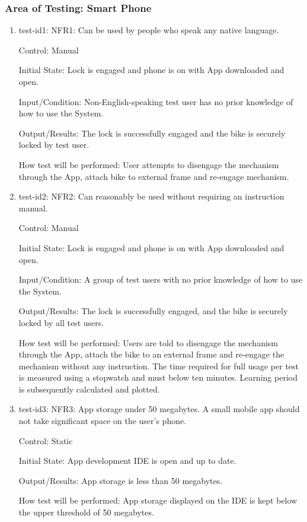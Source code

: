 \documentclass[12pt, titlepage]{article}
\begin{document}
\subsubsection{Area of Testing: Smart Phone}

\begin{enumerate}

\item{test-id1: NFR1: Can be used by people who speak any native language. \\}

Control: Manual

Initial State: Lock is engaged and phone is on with App downloaded and open.

Input/Condition: Non-English-speaking test user has no prior knowledge of how to use the System.

Output/Results: The lock is successfully engaged and the bike is securely locked by test user.

How test will be performed: User attempts to disengage the mechanism through the App, attach bike to external frame and re-engage mechanism.
					
\item{test-id2: NFR2: Can reasonably be used without requiring an instruction manual. \\}

Control: Manual

Initial State: Lock is engaged and phone is on with App downloaded and open.

Input/Condition: A group of test users with no prior knowledge of how to use the System. 

Output/Results: The lock is successfully engaged, and the bike is securely locked by all test users.

How test will be performed: Users are told to disengage the mechanism through the App, attach the bike to an external frame and re-engage the mechanism without any instruction. The time required for full usage per test is measured using a stopwatch and must below ten minutes. Learning period is subsequently calculated and plotted. 

\item{test-id3: NFR3: App storage under 50 megabytes. A small mobile app should not take significant space on the user’s phone.  \\}

Control: Static 

Initial State: App development IDE is open and up to date.

Output/Results: App storage is less than 50 megabytes.

How test will be performed: App storage displayed on the IDE is kept below the upper threshold of 50 megabytes. 

\end{enumerate}
\end{document}
